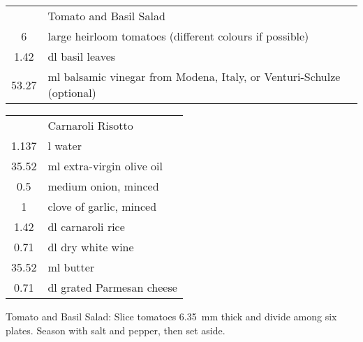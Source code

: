 \documentclass[a4paper]{article}
\newenvironment{instructions}[1]{\noindent\textsf{\textcolor{emphasis}{#1:}}}{\vspace{1ex}}
\begin{document}
\begin{minipage}[t][0.9\textheight]{0.8\textwidth}
        \vspace{1cm}
        \begin{minipage}[t]{0.5\textwidth}
                \vspace{0pt}\raggedright
                \begin{tabular}{Sp{5cm}}
        & \textsf{\textcolor{emphasis}{Tomato and Basil Salad}} \\
                        6 & large heirloom tomatoes (different colours if possible) \\
                        1.42 & \si{dl} basil leaves \\ %
                        53.27 & \si{ml} balsamic vinegar from Modena, Italy, or Venturi-Schulze (optional) \\
                \end{tabular}
        \end{minipage}\hfill
        \begin{minipage}[t]{0.5\textwidth}
                \vspace{0pt}\raggedleft
                \begin{tabular}{Sp{5cm}}
        & \textsf{\textcolor{emphasis}{Carnaroli Risotto}} \\
                        1.137 & \si{l} water \\
                        35.52 & \si{ml} extra-virgin olive oil \\
                        0.5 & medium onion, minced \\
                        1 & clove of garlic, minced \\
                        1.42 & \si{dl} carnaroli rice \\
                        0.71 & \si{dl} dry white wine \\
                        35.52 & \si{ml} butter \\
                        0.71 & \si{dl} grated Parmesan cheese \\
                \end{tabular}
        \end{minipage}
        \vspace{1cm}

        \begin{instructions}{Tomato and Basil Salad}
                Slice tomatoes \SI{6.35}{mm} thick and divide among six plates.
                Season with salt and pepper, then set aside.
        \end{instructions}


\end{minipage}
\end{document}
